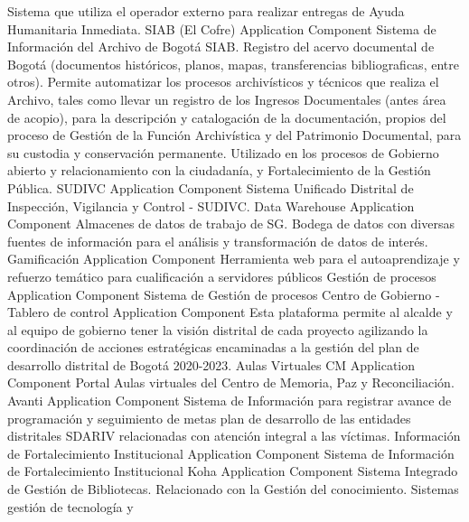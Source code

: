 \documentclass[
	a4paper, %
	12pt, %
]{include/CSSullivanBusinessReport}
\begin{document}
Sistema que utiliza el operador externo para realizar entregas de Ayuda
Humanitaria Inmediata. \textbar{} \textbar{} SIAB (El Cofre) \textbar{}
Application Component \textbar{} Sistema de Información del Archivo de
Bogotá SIAB. Registro del acervo documental de Bogotá (documentos
históricos, planos, mapas, transferencias bibliograficas, entre otros).
Permite automatizar los procesos archivísticos y técnicos que realiza el
Archivo, tales como llevar un registro de los Ingresos Documentales
(antes área de acopio), para la descripción y catalogación de la
documentación, propios del proceso de Gestión de la Función Archivística
y del Patrimonio Documental, para su custodia y conservación permanente.
Utilizado en los procesos de Gobierno abierto y relacionamiento con la
ciudadanía, y Fortalecimiento de la Gestión Pública. \textbar{}
\textbar{} SUDIVC \textbar{} Application Component \textbar{} Sistema
Unificado Distrital de Inspección, Vigilancia y Control - SUDIVC.
\textbar{} \textbar{} Data Warehouse \textbar{} Application Component
\textbar{} Almacenes de datos de trabajo de SG. Bodega de datos con
diversas fuentes de información para el análisis y transformación de
datos de interés. \textbar{} \textbar{} Gamificación \textbar{}
Application Component \textbar{} Herramienta web para el autoaprendizaje
y refuerzo temático para cualificación a servidores públicos \textbar{}
\textbar{} Gestión de procesos \textbar{} Application Component
\textbar{} Sistema de Gestión de procesos \textbar{} \textbar{} Centro
de Gobierno - Tablero de control \textbar{} Application Component
\textbar{} Esta plataforma permite al alcalde y al equipo de gobierno
tener la visión distrital de cada proyecto agilizando la coordinación de
acciones estratégicas encaminadas a la gestión del plan de desarrollo
distrital de Bogotá 2020-2023. \textbar{} \textbar{} Aulas Virtuales CM
\textbar{} Application Component \textbar{} Portal Aulas virtuales del
Centro de Memoria, Paz y Reconciliación. \textbar{} \textbar{} Avanti
\textbar{} Application Component \textbar{} Sistema de Información para
registrar avance de programación y seguimiento de metas plan de
desarrollo de las entidades distritales SDARIV relacionadas con atención
integral a las víctimas. \textbar{} \textbar{} Información de
Fortalecimiento Institucional \textbar{} Application Component
\textbar{} Sistema de Información de Fortalecimiento Institucional
\textbar{} \textbar{} Koha \textbar{} Application Component \textbar{}
Sistema Integrado de Gestión de Bibliotecas. Relacionado con la Gestión
del conocimiento. \textbar{} \textbar{} Sistemas gestión de tecnología y
\end{document}
